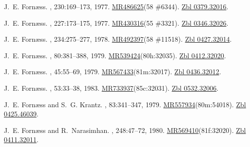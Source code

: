 \documentclass[11pt,a4paper, final, twoside]{article}
\numberwithin{equation}{section}
\begin{document}
\begin{appendices}
\begin{thebibliography}{100}
J.~E. Forn{\ae}ss.
, 230:169--173, 1977.
\newblock \href{http://www.ams.org/mathscinet-getitem?mr=486625}{MR486625}(58
  \#6344). \href{http://zbmath.org/?q=an:0379.32016}{Zbl 0379.32016}.

J.~E. Forn{\ae}ss.
, 227:173--175, 1977.
\newblock \href{http://www.ams.org/mathscinet-getitem?mr=430316}{MR430316}(55
  \#3321). \href{http://zbmath.org/?q=an:0346.32026}{Zbl 0346.32026}.

J.~E. Forn{\ae}ss.
, 234:275--277, 1978.
\newblock \href{http://www.ams.org/mathscinet-getitem?mr=492397}{MR492397}(58
  \#11518). \href{http://zbmath.org/?q=an:0427.32014}{Zbl 0427.32014}.

J.~E. Forn{\ae}ss.
, 80:381--388, 1979.
\newblock
  \href{http://www.ams.org/mathscinet-getitem?mr=539424}{MR539424}(80h:32035).
  \href{http://zbmath.org/?q=an:0412.32020}{Zbl 0412.32020}.

J.~E. Forn{\ae}ss.
, 45:55--69, 1979.
\newblock
  \href{http://www.ams.org/mathscinet-getitem?mr=567433}{MR567433}(81m:32017).
  \href{http://zbmath.org/?q=an:0436.32012}{Zbl 0436.32012}.

J.~E. Forn{\ae}ss.
, 53:33--38, 1983.
\newblock
  \href{http://www.ams.org/mathscinet-getitem?mr=733937}{MR733937}(85c:32031).
  \href{http://zbmath.org/?q=an:0532.32006}{Zbl 0532.32006}.

J.~E. Forn{\ae}ss and S.~G. Krantz.
, 83:341--347, 1979.
\newblock
  \href{http://www.ams.org/mathscinet-getitem?mr=557934}{MR557934}(80m:54018).
  \href{http://zbmath.org/?q=an:0425.46039}{Zbl 0425.46039}.

J.~E. Forn{\ae}ss and R.~Narasimhan.
, 248:47--72, 1980.
\newblock
  \href{http://www.ams.org/mathscinet-getitem?mr=569410}{MR569410}(81f:32020).
  \href{http://zbmath.org/?q=an:0411.32011}{Zbl 0411.32011}.


\end{thebibliography}
\end{appendices}
\end{document}
